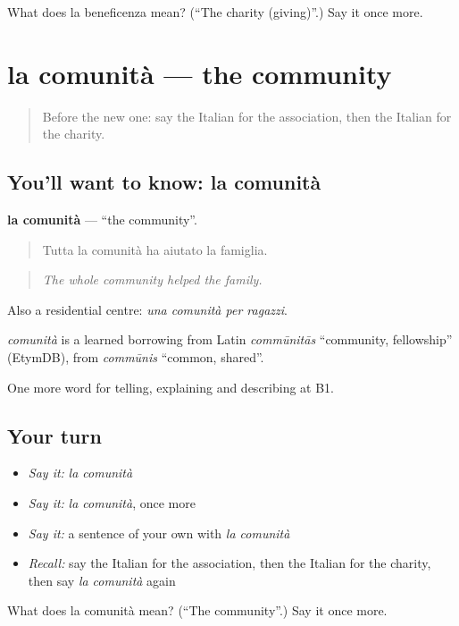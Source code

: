 \begin{tcolorbox}[breakable,colback=teal!4,colframe=teal!35!black,title={Before you move on}]
What does la beneficenza mean? (\textquotedblleft{}The charity (giving)\textquotedblright{}.) Say it once more.
\end{tcolorbox}
\section[la comunità]{la comunità — the community}

\label{lesson:IT-C367-comunita}



\begin{quote}
Before the new one: say the Italian for the association, then the Italian for the charity.
\end{quote}

\subsection*{You'll want to know: la comunità}
\textbf{la comunità} — \textquotedblleft{}the community\textquotedblright{}.

\begin{quote}
Tutta la comunità ha aiutato la famiglia.
\end{quote}

\begin{quote}
\emph{The whole community helped the family.}
\end{quote}

Also a residential centre: \emph{una comunità per ragazzi}.

\begin{cousinweb}
\emph{comunità} is a learned borrowing from Latin \emph{commūnitās} \textquotedblleft{}community, fellowship\textquotedblright{} (EtymDB), from \emph{commūnis} \textquotedblleft{}common, shared\textquotedblright{}.
\end{cousinweb}

\begin{grammarlens}[title={What you've built}]
One more word for telling, explaining and describing at B1.
\end{grammarlens}

\subsection*{Your turn}
\begin{itemize}
\raggedright
  \item \emph{Say it:} \emph{la comunità}
  \item \emph{Say it:} \emph{la comunità}, once more
  \item \emph{Say it:} a sentence of your own with \emph{la comunità}
  \item \emph{Recall:} say the Italian for the association, then the Italian for the charity, then say \emph{la comunità} again
\end{itemize}

\begin{tcolorbox}[breakable,colback=teal!4,colframe=teal!35!black,title={Before you move on}]
What does la comunità mean? (\textquotedblleft{}The community\textquotedblright{}.) Say it once more.
\end{tcolorbox}
